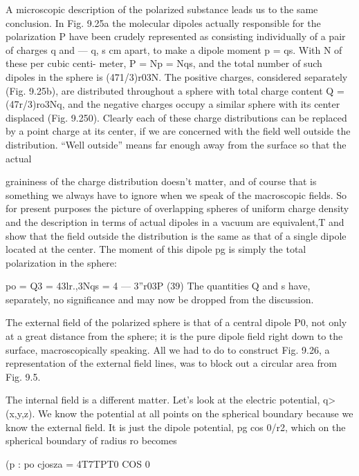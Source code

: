 {A microscopic description of the polarized substance leads us to
the same conclusion. In Fig. 9.25a the molecular dipoles actually
responsible for the polarization P have been crudely represented as
consisting individually of a pair of charges q and  --- q, s cm apart, to
make a dipole moment p = qs. With N of these per cubic centi-
meter, P = Np = Nqs, and the total number of such dipoles in the
sphere is (471/3)r03N. The positive charges, considered separately
(Fig. 9.25b), are distributed throughout a sphere with total charge
content Q = (47r/3)ro3Nq, and the negative charges occupy a similar
sphere with its center displaced (Fig. 9.250). Clearly each of these
charge distributions can be replaced by a point charge at its center,
if we are concerned with the field well outside the distribution. ``Well
outside'' means far enough away from the surface so that the actual

graininess of the charge distribution doesn't matter, and of course
that is something we always have to ignore when we speak of the
macroscopic fields. So for present purposes the picture of overlapping
spheres of uniform charge density and the description in
terms of actual dipoles in a vacuum are equivalent,T and show that
the field outside the distribution is the same as that of a single dipole
located at the center. The moment of this dipole pg is simply the
total polarization in the sphere:

\begin{equation}
\end{equation}
po = Q3 = 43lr.,3Nqs = 4 --- 3''r03P (39)
The quantities Q and s have, separately, no significance and may
now be dropped from the discussion.

The external field of the polarized sphere is that of a central
dipole P0, not only at a great distance from the sphere; it is the pure
dipole field right down to the surface, macroscopically speaking.
All we had to do to construct Fig. 9.26, a representation of the external
field lines, was to block out a circular area from Fig. 9.5.

The internal field is a different matter. Let's look at the electric
potential, q>(x,y,z). We know the potential at all points on the
spherical boundary because we know the external field. It is just
the dipole potential, pg cos 0/r2, which on the spherical boundary of
radius ro becomes

\begin{equation}
\end{equation}
(p : po cjosza = 4T7TPT0 COS 0 

}
